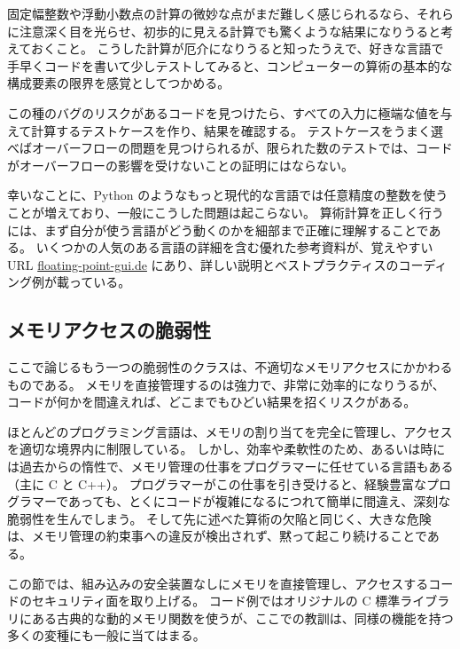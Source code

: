 \documentclass[uplatex]{jsarticle}
\begin{document}
固定幅整数や浮動小数点の計算の微妙な点がまだ難しく感じられるなら、それらに注意深く目を光らせ、初歩的に見える計算でも驚くような結果になりうると考えておくこと。
こうした計算が厄介になりうると知ったうえで、好きな言語で手早くコードを書いて少しテストしてみると、コンピューターの算術の基本的な構成要素の限界を感覚としてつかめる。

この種のバグのリスクがあるコードを見つけたら、すべての入力に極端な値を与えて計算するテストケースを作り、結果を確認する。
テストケースをうまく選べばオーバーフローの問題を見つけられるが、限られた数のテストでは、コードがオーバーフローの影響を受けないことの証明にはならない。

幸いなことに、Python のようなもっと現代的な言語では任意精度の整数を使うことが増えており、一般にこうした問題は起こらない。
算術計算を正しく行うには、まず自分が使う言語がどう動くのかを細部まで正確に理解することである。
いくつかの人気のある言語の詳細を含む優れた参考資料が、覚えやすい URL \url{floating-point-gui.de} にあり、詳しい説明とベストプラクティスのコーディング例が載っている。

\subsection{メモリアクセスの脆弱性}

ここで論じるもう一つの脆弱性のクラスは、不適切なメモリアクセスにかかわるものである。
メモリを直接管理するのは強力で、非常に効率的になりうるが、コードが何かを間違えれば、どこまでもひどい結果を招くリスクがある。

ほとんどのプログラミング言語は、メモリの割り当てを完全に管理し、アクセスを適切な境界内に制限している。
しかし、効率や柔軟性のため、あるいは時には過去からの惰性で、メモリ管理の仕事をプログラマーに任せている言語もある（主に C と C++）。
プログラマーがこの仕事を引き受けると、経験豊富なプログラマーであっても、とくにコードが複雑になるにつれて簡単に間違え、深刻な脆弱性を生んでしまう。
そして先に述べた算術の欠陥と同じく、大きな危険は、メモリ管理の約束事への違反が検出されず、黙って起こり続けることである。

この節では、組み込みの安全装置なしにメモリを直接管理し、アクセスするコードのセキュリティ面を取り上げる。
コード例ではオリジナルの C 標準ライブラリにある古典的な動的メモリ関数を使うが、ここでの教訓は、同様の機能を持つ多くの変種にも一般に当てはまる。

\end{document}
